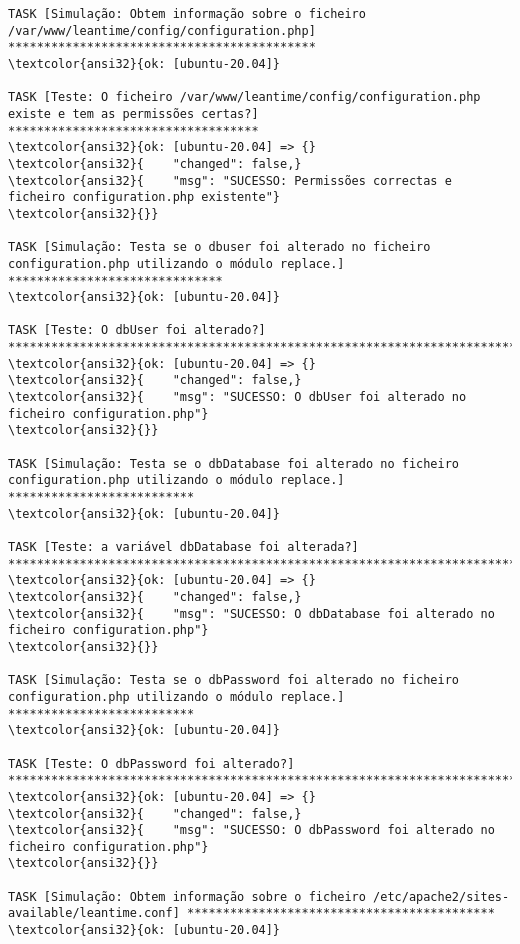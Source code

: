 \documentclass{scrartcl}
\begin{document}
\begin{Verbatim}
TASK [Simulação: Obtem informação sobre o ficheiro /var/www/leantime/config/configuration.php] *******************************************
\textcolor{ansi32}{ok: [ubuntu-20.04]}

TASK [Teste: O ficheiro /var/www/leantime/config/configuration.php existe e tem as permissões certas?] ***********************************
\textcolor{ansi32}{ok: [ubuntu-20.04] => {}
\textcolor{ansi32}{    "changed": false,}
\textcolor{ansi32}{    "msg": "SUCESSO: Permissões correctas e ficheiro configuration.php existente"}
\textcolor{ansi32}{}}

TASK [Simulação: Testa se o dbuser foi alterado no ficheiro configuration.php utilizando o módulo replace.] ******************************
\textcolor{ansi32}{ok: [ubuntu-20.04]}

TASK [Teste: O dbUser foi alterado?] *****************************************************************************************************
\textcolor{ansi32}{ok: [ubuntu-20.04] => {}
\textcolor{ansi32}{    "changed": false,}
\textcolor{ansi32}{    "msg": "SUCESSO: O dbUser foi alterado no ficheiro configuration.php"}
\textcolor{ansi32}{}}

TASK [Simulação: Testa se o dbDatabase foi alterado no ficheiro configuration.php utilizando o módulo replace.] **************************
\textcolor{ansi32}{ok: [ubuntu-20.04]}

TASK [Teste: a variável dbDatabase foi alterada?] ****************************************************************************************
\textcolor{ansi32}{ok: [ubuntu-20.04] => {}
\textcolor{ansi32}{    "changed": false,}
\textcolor{ansi32}{    "msg": "SUCESSO: O dbDatabase foi alterado no ficheiro configuration.php"}
\textcolor{ansi32}{}}

TASK [Simulação: Testa se o dbPassword foi alterado no ficheiro configuration.php utilizando o módulo replace.] **************************
\textcolor{ansi32}{ok: [ubuntu-20.04]}

TASK [Teste: O dbPassword foi alterado?] *************************************************************************************************
\textcolor{ansi32}{ok: [ubuntu-20.04] => {}
\textcolor{ansi32}{    "changed": false,}
\textcolor{ansi32}{    "msg": "SUCESSO: O dbPassword foi alterado no ficheiro configuration.php"}
\textcolor{ansi32}{}}

TASK [Simulação: Obtem informação sobre o ficheiro /etc/apache2/sites-available/leantime.conf] *******************************************
\textcolor{ansi32}{ok: [ubuntu-20.04]}


\end{Verbatim}
\end{document}
